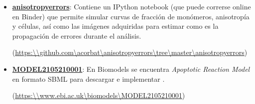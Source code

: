 \begin{appendices}
\begin{itemize}
\item \href{https://github.com/acorbat/anisotropy_errors/tree/master/anisotropy_errors}{\textbf{anisotropy\textunderscore errors}}: Contiene un IPython notebook (que puede correrse online en Binder) que permite simular curvas de fracción de monómeros, anisotropía y células, así como las imágenes adquiridas para estimar como es la propagación de errores durante el análisis.

(\href{https://github.com/acorbat/anisotropy_errors/tree/master/anisotropy_errors}{https:\textbackslash \textbackslash github.com\textbackslash acorbat\textbackslash anisotropy\textunderscore errors\textbackslash tree\textbackslash master\textbackslash anisotropy\textunderscore errors})

\item \href{https://www.ebi.ac.uk/biomodels/MODEL2105210001}{\textbf{MODEL2105210001}}: En Biomodels se encuentra \textit{Apoptotic Reaction Model} en formato SBML para descargar e implementar \citep{Malik-Sheriff2019}.

(\href{https://www.ebi.ac.uk/biomodels/MODEL2105210001}{https:\textbackslash \textbackslash www.ebi.ac.uk\textbackslash biomodels\textbackslash MODEL2105210001})

\end{itemize}

\end{appendices}